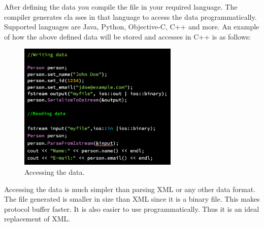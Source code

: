 \documentclass[11pt, conference, a4paper]{IEEEtran}
\begin{document}
After defining the data you compile the file in your required language. The compiler generates cla	sses in that language to access the data programmatically. Supported languages are Java, Python, Objective-C, C++ and more. An example of how the above defined data will be stored and accesses in C++ is as follows:
\begin{figure}[H]
\begin{center}
  \includegraphics[width=3in]{access_data.png}
  \caption{Accessing the data.\cite{prot-buff}}
\end{center}
\end{figure}

Accessing the data is much simpler than parsing XML or any other data format. The file generated is smaller in size than XML since it is a binary file. This makes protocol buffer faster. It is also easier to use programmatically. Thus it is an ideal replacement of XML. 
\end{document}
